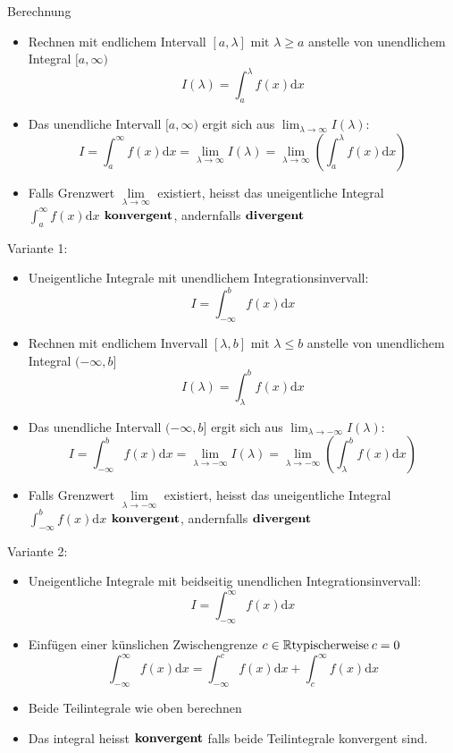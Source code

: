 \begin{KR}{Berechnung}\\
\begin{itemize}
	\item Rechnen mit endlichem Intervall \([a,\lambda] \text{ mit } \lambda \ge a \) anstelle von unendlichem
		Integral \([a,\infty) \)
		\[I(\lambda)=\int_a^{\lambda}{f(x)\mathrm{d}x} \]
	\item Das unendliche Intervall \([a,\infty) \) ergit sich aus \(\lim_{\lambda \rightarrow
		\infty}I(\lambda) \):
		\[I=\int_a^{\infty}{f(x)\mathrm{d}x}=\underset{\lambda \rightarrow \infty}{\lim}I(\lambda)=
		\underset{\lambda \rightarrow \infty}{\lim}\left(\int_a^{\lambda}{f(x)\mathrm{d}x}\right) \]
	\item Falls Grenzwert \(\underset{\lambda \rightarrow \infty}{\lim}\) existiert, heisst das uneigentliche
		Integral \(\displaystyle\int_a^{\infty}{f(x)\mathrm{d}x}\) \(\bold{konvergent}\), andernfalls 
		\(\bold{divergent}\)
\end{itemize}
		\tcbline	
		Variante 1:
\begin{itemize}
	\item Uneigentliche Integrale mit unendlichem Integrationsinvervall:
	\[I=\int_{-\infty}^b{f(x)\mathrm{d}x} \]
	\item Rechnen mit endlichem Invervall \([\lambda,b] \text{ mit } \lambda \le b \) anstelle von unendlichem
		Integral \((-\infty,b] \)
		\[I(\lambda)=\int_{\lambda}^b{f(x)\mathrm{d}x} \]
	\item Das unendliche Intervall \((-\infty,b] \) ergit sich aus \(\lim_{\lambda \rightarrow
		-\infty}I(\lambda) \):
		\[I=\int_{-\infty}^b{f(x)\mathrm{d}x}=\underset{\lambda \rightarrow -\infty}{\lim}I(\lambda)=
		\underset{\lambda \rightarrow -\infty}{\lim}\left(\int_{\lambda}^b{f(x)\mathrm{d}x}\right) \]
	\item Falls Grenzwert \(\underset{\lambda \rightarrow -\infty}{\lim}\) existiert, heisst das uneigentliche
		Integral \(\displaystyle\int_{-\infty}^b{f(x)\mathrm{d}x}\) \(\bold{konvergent}\), andernfalls 
		\(\bold{divergent}\)
\end{itemize}
	\tcbline
	Variante 2:
	\begin{itemize}
		\item Uneigentliche Integrale mit beidseitig unendlichen Integrationsinvervall:
			\[I=\int_{-\infty}^{\infty}{f(x)\mathrm{d}x}\]
		\item Einfügen einer künslichen Zwischengrenze \(c \in \mathbb{R}\\\text{typischerweise}\:c=0 \)
			\[\int_{-\infty}^{\infty}{f(x)\mathrm{d}x}=\int_{-\infty}^{c}{f(x)\mathrm{d}x}+\int_c^{\infty}{f(x)\mathrm{d}x} 
			\]
		\item Beide Teilintegrale wie oben berechnen
		\item Das integral heisst \(\bold{konvergent}\) falls beide Teilintegrale konvergent sind.
	\end{itemize}
\end{KR}
